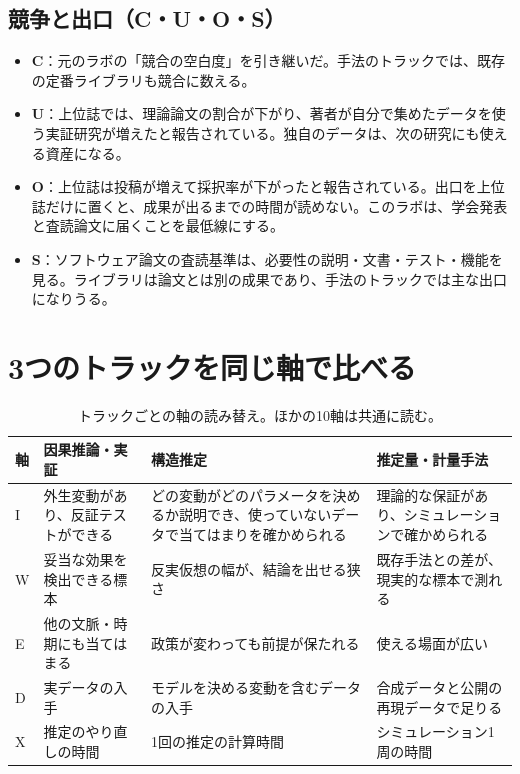 \documentclass[a4paper,10pt]{ltjsarticle}
\begin{document}
\subsection{競争と出口（C・U・O・S）}

\begin{itemize}[leftmargin=*]
  \item \textbf{C}：元のラボの「競合の空白度」を引き継いだ\parencite{indxlab}。手法のトラックでは、既存の定番ライブラリも競合に数える。
  \item \textbf{U}：上位誌では、理論論文の割合が下がり、著者が自分で集めたデータを使う実証研究が増えたと報告されている\parencite{hamermesh2013}。独自のデータは、次の研究にも使える資産になる。
  \item \textbf{O}：上位誌は投稿が増えて採択率が下がったと報告されている\parencite{card2013}。出口を上位誌だけに置くと、成果が出るまでの時間が読めない。このラボは、学会発表と査読論文に届くことを最低線にする。
  \item \textbf{S}：ソフトウェア論文の査読基準は、必要性の説明・文書・テスト・機能を見る\parencite{josscriteria}。ライブラリは論文とは別の成果であり、手法のトラックでは主な出口になりうる。
\end{itemize}

\section{3つのトラックを同じ軸で比べる}\label{sec:th-track}

\begin{table}[htbp]
\centering\small
\begin{tabularx}{\linewidth}{lXXX}
\toprule
軸 & 因果推論・実証 & 構造推定 & 推定量・計量手法 \\
\midrule
I & 外生変動があり、反証テストができる & どの変動がどのパラメータを決めるか説明でき、使っていないデータで当てはまりを確かめられる & 理論的な保証があり、シミュレーションで確かめられる \\
W & 妥当な効果を検出できる標本 & 反実仮想の幅が、結論を出せる狭さ & 既存手法との差が、現実的な標本で測れる \\
E & 他の文脈・時期にも当てはまる & 政策が変わっても前提が保たれる & 使える場面が広い \\
D & 実データの入手 & モデルを決める変動を含むデータの入手 & 合成データと公開の再現データで足りる \\
X & 推定のやり直しの時間 & 1回の推定の計算時間 & シミュレーション1周の時間 \\
\bottomrule
\end{tabularx}
\caption{トラックごとの軸の読み替え。ほかの10軸は共通に読む。}
\label{tab:th-track}
\end{table}
\end{document}
